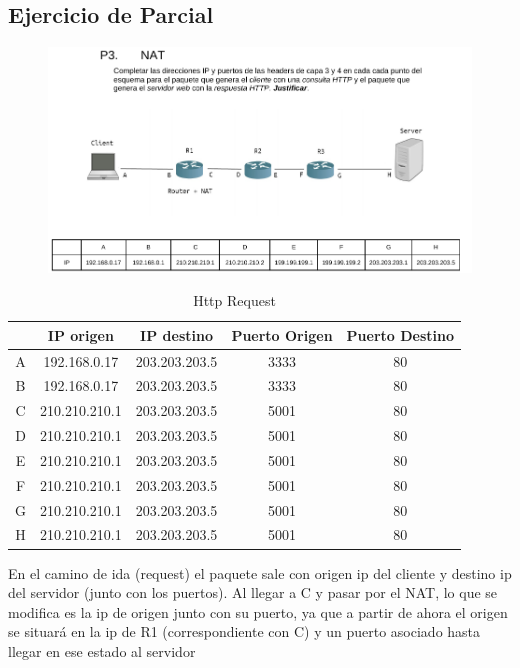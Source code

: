 \subsection{Ejercicio de Parcial}

\begin{figure}[H]
\centering
\includegraphics[width=\textwidth]{imagenes/enunciadoNat.png}
\end{figure}

\begin{table}[H]
    \centering
    \begin{tabular}{c|c|c|c|c}
         & IP origen & IP destino & Puerto Origen & Puerto Destino \\
         \hline
         \hline
        A & 192.168.0.17 & 203.203.203.5 & 3333 & 80 \\
        B &  192.168.0.17 & 203.203.203.5 & 3333 & 80\\
        C &  210.210.210.1 & 203.203.203.5 & 5001 & 80\\
        D &  210.210.210.1 & 203.203.203.5 & 5001 & 80\\
        E &  210.210.210.1 & 203.203.203.5 & 5001 & 80\\
        F &  210.210.210.1 & 203.203.203.5 & 5001 & 80\\
        G &  210.210.210.1 & 203.203.203.5 & 5001 & 80\\
        H &  210.210.210.1 & 203.203.203.5 & 5001 & 80\\
    \end{tabular}
    \caption{Http Request}
    \label{tab:my_label}
\end{table}

En el camino de ida (request) el paquete sale con origen ip del cliente y destino ip del servidor (junto con los puertos). Al llegar a C y pasar por el NAT, lo que se modifica es la ip de origen junto con su puerto, ya que a partir de ahora el origen se situará en la ip de R1 (correspondiente con C) y un puerto asociado hasta llegar en ese estado al servidor

